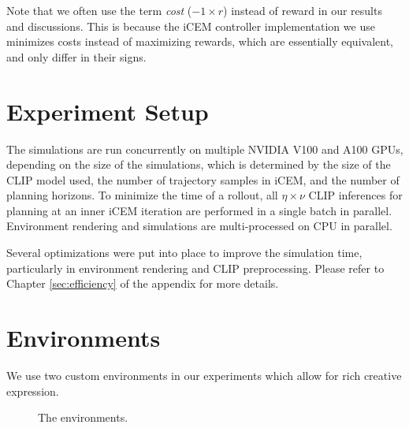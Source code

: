 Note that we often use the term \emph{cost} (\(-1 \times r\)) instead of reward in our results and discussions. This is because the iCEM controller implementation we use minimizes costs instead of maximizing rewards, which are essentially equivalent, and only differ in their signs.

\section{Experiment Setup}
\label{sec:experiment-setup}

The simulations are run concurrently on multiple NVIDIA V100 and A100 GPUs, depending on the size of the simulations, which is determined by the size of the CLIP model used, the number of trajectory samples in iCEM, and the number of planning horizons.
To minimize the time of a rollout, all \(\eta \times \nu\) CLIP inferences for planning at an inner iCEM iteration are performed in a single batch in parallel.
Environment rendering and simulations are multi-processed on CPU in parallel.

Several optimizations were put into place to improve the simulation time, particularly in environment rendering and CLIP preprocessing.
Please refer to Chapter \ref{sec:efficiency} of the appendix for more details.

\section{Environments}
\label{sec:environments}
We use two custom environments in our experiments which allow for rich creative expression.

\begin{figure}[H]
    \centering
    \qquad
    \caption{The environments.}
    \label{fig:environments}
\end{figure}

